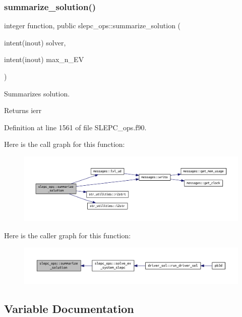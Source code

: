 \subsubsection{\texorpdfstring{summarize\+\_\+solution()}{summarize\_solution()}}
{\footnotesize\ttfamily integer function, public slepc\+\_\+ops\+::summarize\+\_\+solution (\begin{DoxyParamCaption}\item[{intent(inout)}]{solver,  }\item[{intent(inout)}]{max\+\_\+n\+\_\+\+EV }\end{DoxyParamCaption})}



Summarizes solution. 

\begin{DoxyReturn}{Returns}
ierr 
\end{DoxyReturn}


Definition at line 1561 of file S\+L\+E\+P\+C\+\_\+ops.\+f90.

Here is the call graph for this function\+:\nopagebreak
\begin{figure}[H]
\begin{center}
\leavevmode
\includegraphics[width=350pt]{namespaceslepc__ops_a03193dbc55e7061891d58e96a2bf1dd5_cgraph}
\end{center}
\end{figure}
Here is the caller graph for this function\+:\nopagebreak
\begin{figure}[H]
\begin{center}
\leavevmode
\includegraphics[width=350pt]{namespaceslepc__ops_a03193dbc55e7061891d58e96a2bf1dd5_icgraph}
\end{center}
\end{figure}


\subsection{Variable Documentation}
\mbox{\label{namespaceslepc__ops_ad57b5fd70608c1b97454963bdd1c4f5b}} 
